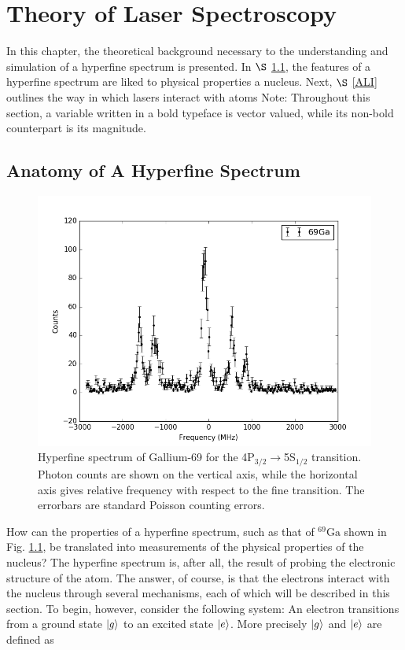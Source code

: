 \documentclass[12pt,a4paper,margin=1in]{report}
\begin{document}
\chapter{Theory of Laser Spectroscopy}
In this chapter, the theoretical background necessary to the understanding and simulation of a hyperfine spectrum is presented. In $\S$ \ref{AHF}, the features of a hyperfine spectrum are liked to physical properties a nucleus. Next, $\S$ \ref{ALI} outlines the way in which lasers interact with atoms
Note: Throughout this section, a variable written in a bold typeface is vector valued, while its non-bold counterpart is its magnitude. 
\section{Anatomy of A Hyperfine Spectrum}
\label{AHF}
\begin{figure}[h]
\includegraphics[width=\textwidth]{Graphics/ga69.png}
\caption{Hyperfine spectrum of Gallium-69 for the 4P$_{3/2}\rightarrow$5S$_{1/2}$ transition. Photon counts are shown on the vertical axis, while the horizontal axis gives relative frequency with respect to the fine transition. The errorbars are standard Poisson counting errors.}
\label{ga69}
\end{figure}
How can the properties of a hyperfine spectrum, such as that of $^{69}\mathrm{Ga}$ shown in Fig. \ref{ga69}, be translated into measurements of the physical properties of the nucleus? The hyperfine spectrum is, after all, the result of probing the electronic structure of the atom. The answer, of course, is that the electrons interact with the nucleus through several mechanisms, each of which will be described in this section. To begin, however, consider the following system: An electron transitions from a ground state $\ket{g}$ to an excited state $\ket{e}$. More precisely $\ket{g}$ and $\ket{e}$ are defined as 
\end{document}
